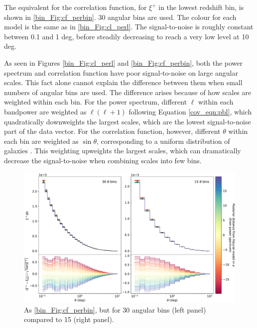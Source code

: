 The equivalent for the correlation function, for $\xi^+$ in the lowest redshift bin, is shown in \autoref{bin_Fig:cf_perbin}. 30 angular bins are used. The colour for each model is the same as in \autoref{bin_Fig:cl_perl}. The signal-to-noise is roughly constant between 0.1 and 1 deg, before steadily decreasing to reach a very low level at 10 deg.

As seen in Figures \ref{bin_Fig:cl_perl} and \ref{bin_Fig:cf_perbin}, both the power spectrum and correlation function have poor signal-to-noise on large angular scales. This fact alone cannot explain the difference between them when small numbers of angular bins are used. The difference arises because of how scales are weighted within each bin. For the power spectrum, different $\ell$ within each bandpower are weighted as $\ell \left( \ell + 1 \right)$ following Equation \eqref{cov_eqn:pbl}, which quadratically downweights the largest scales, which are the lowest signal-to-noise part of the data vector. For the correlation function, however, different $\theta$ within each bin are weighted as $\sin{\theta}$, corresponding to a uniform distribution of galaxies \citep{Friedrich2021}. This weighting upweights the largest scales, which can dramatically decrease the signal-to-noise when combining scales into few bins.

\begin{figure}[tp]
\includegraphics[width=\textwidth]{cf_perbin_30vs15}
\caption{As \autoref{bin_Fig:cf_perbin}, but for 30 angular bins (left panel) compared to 15 (right panel).}
\label{bin_Fig:cf_perbin_30vs15}
\end{figure}

